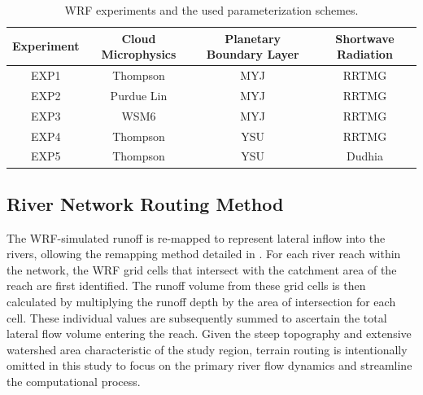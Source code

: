 \documentclass[draft]{agujournal2019}
\begin{document}
\begin{table}[h!]
      \doublerulesep 0.3pt
      \renewcommand{\arraystretch}{1}  %
      \caption{WRF experiments and the used parameterization schemes.}
      \label{tab:wrf_experiment}
      \vspace*{5mm}
      \begin{tabular*}{140mm}{cccc}
            \hline
            Experiment & Cloud Microphysics & Planetary Boundary Layer & Shortwave Radiation \\
            \hline
            EXP1 & Thompson & MYJ & RRTMG \\
            EXP2 & Purdue Lin & MYJ & RRTMG \\
            EXP3 & WSM6 & MYJ & RRTMG \\
            EXP4 & Thompson & YSU & RRTMG \\
            EXP5 & Thompson & YSU & Dudhia \\
            \hline
      \end{tabular*}
      \renewcommand{\arraystretch}{1}  %
\end{table}

\subsection{River Network Routing Method}
\label{sec:river}

The WRF-simulated runoff is re-mapped to represent lateral inflow into the rivers, ollowing the remapping method detailed in \cite{lin2018EMS, wang2019CSB}. For each river reach within the network, the WRF grid cells that intersect with the catchment area of the reach are first identified. The runoff volume from these grid cells is then calculated by multiplying the runoff depth by the area of intersection for each cell. These individual values are subsequently summed to ascertain the total lateral flow volume entering the reach. Given the steep topography and extensive watershed area characteristic of the study region, terrain routing is intentionally omitted in this study to focus on the primary river flow dynamics and streamline the computational process.
\end{document}
